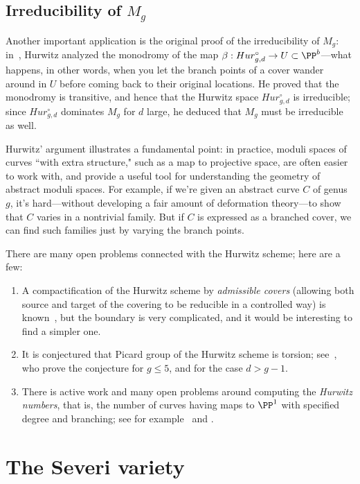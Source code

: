 \subsection{Irreducibility of $M_g$}

Another important application is the original proof of the irreducibility of $M_g$: in~\cite{Hurwitz}, Hurwitz analyzed the monodromy of the map $\beta: Hur^\circ_{g,d} \to U \subset \PP^b$---what happens, in other words, when you let the branch points of a cover wander around in $U$ before coming back to their original locations. He proved that the monodromy is transitive, and hence that the Hurwitz space $Hur^\circ_{g,d}$ is irreducible; since $Hur^\circ_{g,d}$ dominates $M_g$ for $d$ large, he deduced that $M_g$ must be irreducible as well.

Hurwitz' argument illustrates a fundamental point: in practice, moduli spaces of curves ``with extra structure," such as a map to projective space, are often easier to work with, and provide a useful tool for understanding the geometry of abstract moduli spaces. For example, if we're given an abstract curve $C$ of genus $g$, it's hard---without developing a fair amount of deformation theory---to show that $C$ varies in a nontrivial family. But if $C$ is expressed as a branched cover, we can find such families just by varying the branch points.

There are many open problems connected with the Hurwitz scheme; here are a few:
\begin{enumerate}
 \item A compactification of the Hurwitz scheme by \emph{admissible covers} (allowing both source and target
of the covering to be reducible in a controlled way) is known~\cite{MR1631825}, but the boundary is very complicated, and it would be interesting to find a simpler one.

\item It is conjectured that  Picard group of the Hurwitz scheme is torsion; see~\cite{MR3320849}, who prove the conjecture for $g\leq 5$, and \cite{mullane} for the case $d>g-1$.

\item There is active work and many open problems around computing the \emph{Hurwitz numbers}, that is,
the number of curves having maps to $\PP^{1}$ with specified degree and branching; see for example~\cite{Hurwitz2} and \cite{ELSV}.
\end{enumerate}

\section{The Severi variety}\label{severi variety}

